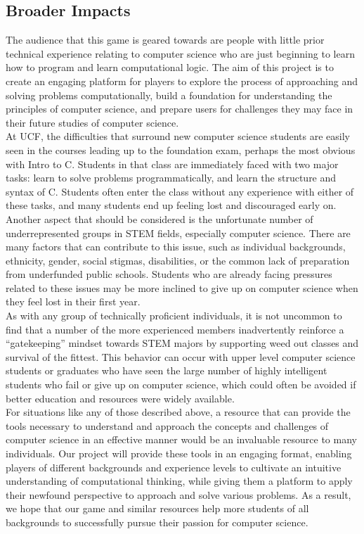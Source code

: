 \subsection{Broader Impacts}

The audience that this game is geared towards are people with little prior
technical experience relating to computer science who are just beginning to
learn how to program and learn computational logic. The aim of this project is
to create an engaging platform for players to explore the process of approaching
and solving problems computationally, build a foundation for understanding the
principles of computer science, and prepare users for challenges they may face
in their future studies of computer science.\\

At UCF, the difficulties that surround new computer science students are easily
seen in the courses leading up to the foundation exam, perhaps the most obvious
with Intro to C. Students in that class are immediately faced with two major
tasks: learn to solve problems programmatically, and learn the structure and
syntax of C. Students often enter the class without any experience with either
of these tasks, and many students end up feeling lost and discouraged early
on.\\

Another aspect that should be considered is the unfortunate number of
underrepresented groups in STEM fields, especially computer science. There are
many factors that can contribute to this issue, such as individual backgrounds,
ethnicity, gender, social stigmas, disabilities, or the common lack of
preparation from underfunded public schools. Students who are already facing
pressures related to these issues may be more inclined to give up on computer
science when they feel lost in their first year.\\

As with any group of technically proficient individuals, it is not uncommon to
find that a number of the more experienced members inadvertently reinforce a
“gatekeeping” mindset towards STEM majors by supporting weed out classes and
survival of the fittest. This behavior can occur with upper level computer
science students or graduates who have seen the large number of highly
intelligent students who fail or give up on computer science, which could often
be avoided if better education and resources were widely available.\\

For situations like any of those described above, a resource that can provide
the tools necessary to understand and approach the concepts and challenges of
computer science in an effective manner would be an invaluable resource to many
individuals. Our project will provide these tools in an engaging format,
enabling players of different backgrounds and experience levels to cultivate an
intuitive understanding of computational thinking, while giving them a platform
to apply their newfound perspective to approach and solve various problems. As a
result, we hope that our game and similar resources help more students of all
backgrounds to successfully pursue their passion for computer science.\\

